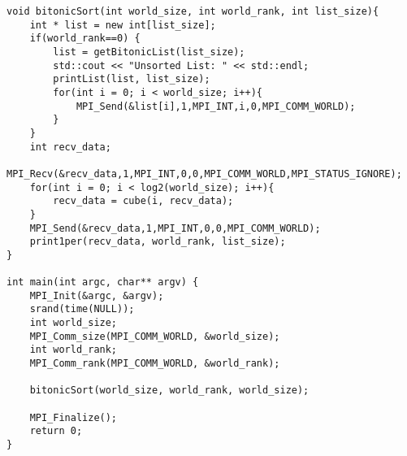 \documentclass[12pt]{article}
\begin{document}
\begin{verbatim}
void bitonicSort(int world_size, int world_rank, int list_size){
	int * list = new int[list_size];
	if(world_rank==0) {
		list = getBitonicList(list_size);
		std::cout << "Unsorted List: " << std::endl;
		printList(list, list_size);
		for(int i = 0; i < world_size; i++){
			MPI_Send(&list[i],1,MPI_INT,i,0,MPI_COMM_WORLD);
		}
	}
	int recv_data;
	MPI_Recv(&recv_data,1,MPI_INT,0,0,MPI_COMM_WORLD,MPI_STATUS_IGNORE);
	for(int i = 0; i < log2(world_size); i++){
		recv_data = cube(i, recv_data);
	}
	MPI_Send(&recv_data,1,MPI_INT,0,0,MPI_COMM_WORLD);
	print1per(recv_data, world_rank, list_size);
}

int main(int argc, char** argv) {
	MPI_Init(&argc, &argv);
	srand(time(NULL));
	int world_size;
	MPI_Comm_size(MPI_COMM_WORLD, &world_size);
	int world_rank;
	MPI_Comm_rank(MPI_COMM_WORLD, &world_rank);

	bitonicSort(world_size, world_rank, world_size);

	MPI_Finalize();
	return 0;
}

\end{verbatim}
\end{document}
